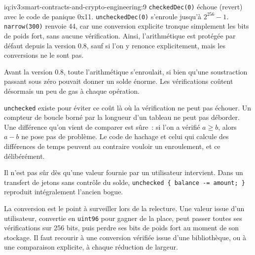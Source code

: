 \begin{solution}{iq:iv3:smart-contracts-and-crypto-engineering:9}
\texttt{checkedDec(0)} échoue (revert) avec le code de panique 0x11. \texttt{uncheckedDec(0)} s'enroule jusqu'à $2^{256} - 1$. \texttt{narrow(300)} renvoie 44, car une conversion explicite tronque simplement les bits de poids fort, sans aucune vérification. Ainsi, l'arithmétique est protégée par défaut depuis la version 0.8, sauf si l'on y renonce explicitement, mais les conversions ne le sont pas.

Avant la version 0.8, toute l'arithmétique s'enroulait, si bien qu'une soustraction passant sous zéro pouvait donner un solde énorme. Les vérifications coûtent désormais un peu de gas à chaque opération.

\texttt{unchecked} existe pour éviter ce coût là où la vérification ne peut pas échouer. Un compteur de boucle borné par la longueur d'un tableau ne peut pas déborder. Une différence qu'on vient de comparer est sûre~: si l'on a vérifié $a \ge b$, alors $a - b$ ne pose pas de problème. Le code de hachage et celui qui calcule des différences de temps peuvent au contraire vouloir un enroulement, et ce délibérément.

Il n'est pas sûr dès qu'une valeur fournie par un utilisateur intervient. Dans un transfert de jetons sans contrôle du solde, \texttt{unchecked \{ balance -= amount; \}} reproduit intégralement l'ancien bogue.

La conversion est le point à surveiller lors de la relecture. Une valeur issue d'un utilisateur, convertie en \texttt{uint96} pour gagner de la place, peut passer toutes ses vérifications sur 256 bits, puis perdre ses bits de poids fort au moment de son stockage. Il faut recourir à une conversion vérifiée issue d'une bibliothèque, ou à une comparaison explicite, à chaque réduction de largeur.

\end{solution}

